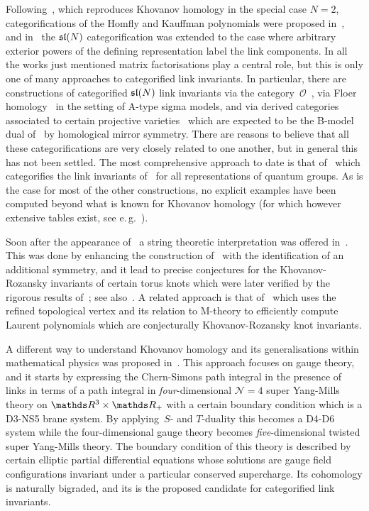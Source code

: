 \documentclass{compositio}
\theoremstyle{definition}
\numberwithin{equation}{section}
\begin{document}
Following~\cite{kr0401268}, which reproduces Khovanov homology in the special case $N=2$, categorifications of the Homfly and Kauffman polynomials were proposed in~\cite{kr0505056, kr0701333}, and in~\cite{y0906.0220, w0907.0695} the $\mathfrak{sl}(N)$ categorification was extended to the case where arbitrary exterior powers of the defining representation label the link components. In all the works just mentioned matrix factorisations play a central role, but this is only one of many approaches to categorified link invariants. In particular, there are constructions of categorified $\mathfrak{sl}(N)$ link invariants via the category~$\mathcal O$~\cite{sCatTLcTCpf, ms0709.1971, s0701045}, via Floer homology~\cite{ss0405089, m0601629} in the setting of A-type sigma models, and via derived categories associated to certain projective varieties~\cite{ck0701194, ck0710.3216} which are expected to be the B-model dual of~\cite{ss0405089, m0601629} by homological mirror symmetry. There are reasons to believe that all these categorifications are very closely related to one another, but in general this has not been settled. The most comprehensive approach to date is that of~\cite{w1005.4559} which categorifies the link invariants of~\cite{RT1990, RT1991} for all representations of quantum groups. As is the case for most of the other constructions, no explicit examples have been computed beyond what is known for Khovanov homology (for which however extensive tables exist, see e.\,g.~\cite{bnKhovanov11crossings}). 

Soon after the appearance of~\cite{kr0401268} a string theoretic interpretation was offered in~\cite{gsv0412243}. This was done by enhancing the construction of~\cite{ov9912123} with the identification of an additional symmetry, and it lead to precise conjectures for the Khovanov-Rozansky invariants of certain torus knots which were later verified by the rigorous results of~\cite{r0508510, r0607544}; see also~\cite{dgr0505662, gw0512298}. A related approach is that of~\cite{as1105.5117} which uses the refined topological vertex and its relation to M-theory to efficiently compute Laurent polynomials which are conjecturally Khovanov-Rozansky knot invariants. 

A different way to understand Khovanov homology and its generalisations within mathematical physics was proposed in~\cite{w1101.3216}. This approach focuses on gauge theory, and it starts by expressing the Chern-Simons path integral in the presence of links in terms of a path integral in \emph{four}-dimensional $\mathcal N=4$ super Yang-Mills theory on $\nR^3\times\nR_{+}$ with a certain boundary condition which is a D3-NS5 brane system. By applying~$S$- and $T$-duality this becomes a D4-D6 system while the four-dimensional gauge theory becomes \emph{five}-dimensional twisted super Yang-Mills theory. The boundary condition of this theory is described by certain elliptic partial differential equations whose solutions are gauge field configurations invariant under a particular conserved supercharge. Its cohomology is naturally bigraded, and its is the proposed candidate for categorified link invariants. 
\end{document}
